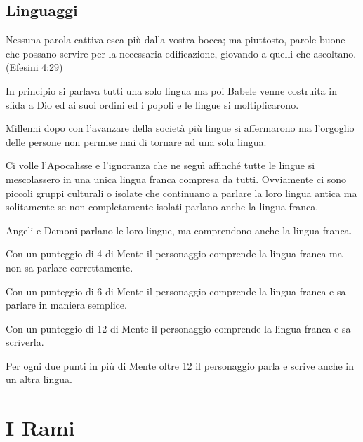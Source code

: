 \documentclass[12pt,a4paper,twoside,openany]{book}
\begin{document}
\pagebreak

\subsection{Linguaggi}

\begin{changemargin}{0.3cm}{0.3cm}\begin{enfasi}{
Nessuna parola cattiva esca più dalla vostra bocca; ma piuttosto, parole buone che possano servire per la necessaria edificazione, giovando a quelli che ascoltano. (Efesini 4:29)
}\end{enfasi}\end{changemargin}

\begin{multicols}{2}

In principio si parlava tutti una solo lingua ma poi Babele venne costruita in sfida a Dio ed ai suoi ordini ed i popoli e le lingue si moltiplicarono.

Millenni dopo con l'avanzare della società più lingue si affermarono ma l'orgoglio delle persone non permise mai di tornare ad una sola lingua.

Ci volle l'Apocalisse e l'ignoranza che ne seguì affinché tutte le lingue si mescolassero in una unica lingua franca  compresa da tutti. Ovviamente ci sono piccoli gruppi culturali o isolate che continuano a parlare la loro lingua antica ma solitamente se non completamente isolati parlano anche la lingua franca.

Angeli e Demoni parlano le loro lingue, ma comprendono anche la lingua franca.

Con un punteggio di 4 di Mente il personaggio comprende la lingua franca ma non sa parlare correttamente.

Con un punteggio di 6 di Mente il personaggio comprende la lingua franca e sa parlare in maniera semplice.

Con un punteggio di 12 di Mente il personaggio comprende la lingua franca e sa scriverla.

Per ogni due punti in più di Mente oltre 12 il personaggio parla e scrive anche in un altra lingua.
\end{multicols}

\pagebreak


\section{I Rami}
\end{document}
